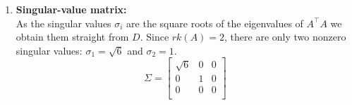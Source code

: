 \begin{enumerate}
    \[
        \begin{customArrayStretch}{2}
        V = P =
        \begin{bmatrix}
            \dfrac{5}{\sqrt{30}} & 0 & -\dfrac{1}{\sqrt{6}} \\
            -\dfrac{2}{\sqrt{30}} & \dfrac{1}{\sqrt{5}} & -\dfrac{2}{\sqrt{6}} \\
            \dfrac{1}{\sqrt{30}} & \dfrac{2}{\sqrt{5}} & \dfrac{1}{\sqrt{6}} \\
        \end{bmatrix}
        \end{customArrayStretch}
    \]

    \vspace{0.5cm}
    \item \textbf{Singular-value matrix:}\\
    As the singular values $\sigma _i$ are the square roots of the eigenvalues of $A^\top A$ we obtain them straight from $D$. Since $rk(A) = 2$, there are only two nonzero singular values: $\sigma _1 = \sqrt{6}$ and $\sigma _2 = 1$.
    \[
        \Sigma = 
        \begin{bmatrix}
            \sqrt{6} & 0 & 0 \\
            0 & 1 & 0 \\
            0 & 0 & 0 \\
        \end{bmatrix}
    \]


\end{enumerate}
